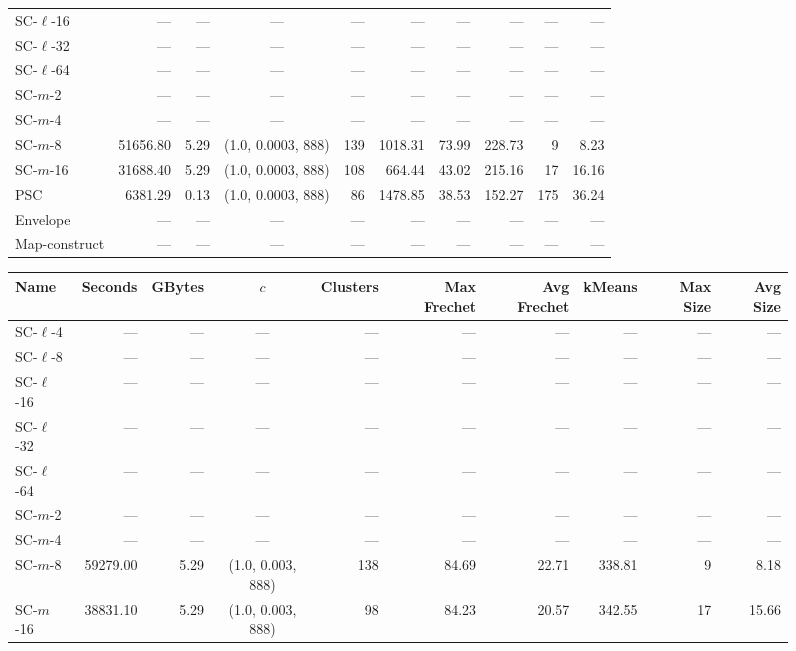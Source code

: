 \begin{figure}
\begin{center}
\begin{minipage}{\textwidth}
{\begin{tabular}{@{}lrrcrrrrrr@{}}
        SC-$\ell$-16 & --- & --- & --- & --- & --- & --- & --- & --- & ---\\
        SC-$\ell$-32 & --- & --- & --- & --- & --- & --- & --- & --- & ---\\
        SC-$\ell$-64 & --- & --- & --- & --- & --- & --- & --- & --- & ---\\
        SC-$m$-2 & --- & --- & --- & --- & --- & --- & --- & --- & ---\\
        SC-$m$-4 & --- & --- & --- & --- & --- & --- & --- & --- & ---\\
        SC-$m$-8 & 51656.80 & 5.29 & (1.0, 0.0003, 888) & 139 & 1018.31 & 73.99 & 228.73 & 9 & 8.23\\
        SC-$m$-16 & 31688.40 & 5.29 & (1.0, 0.0003, 888) & 108 & 664.44 & 43.02 & 215.16 & 17 & 16.16\\
        PSC & 6381.29 & 0.13 & (1.0, 0.0003, 888) & 86 & 1478.85 & 38.53 & 152.27 & 175 & 36.24\\
        Envelope & --- & --- & --- & --- & --- & --- & --- & --- & ---\\
        Map-construct & --- & --- & --- & --- & --- & --- & --- & --- & ---\\
        \bottomrule
    \end{tabular}
    }
    {
    \begin{tabular}{@{}lrrcrrrrrr@{}}
        \toprule
        Name & Seconds & GBytes & $c$ & Clusters & Max Frechet & Avg Frechet & kMeans & Max Size & Avg Size\\
        \midrule
        SC-$\ell$-4 & --- & --- & --- & --- & --- & --- & --- & --- & ---\\
        SC-$\ell$-8 & --- & --- & --- & --- & --- & --- & --- & --- & ---\\
        SC-$\ell$-16 & --- & --- & --- & --- & --- & --- & --- & --- & ---\\
        SC-$\ell$-32 & --- & --- & --- & --- & --- & --- & --- & --- & ---\\
        SC-$\ell$-64 & --- & --- & --- & --- & --- & --- & --- & --- & ---\\
        SC-$m$-2 & --- & --- & --- & --- & --- & --- & --- & --- & ---\\
        SC-$m$-4 & --- & --- & --- & --- & --- & --- & --- & --- & ---\\
        SC-$m$-8 & 59279.00 & 5.29 & (1.0, 0.003, 888) & 138 & 84.69 & 22.71 & 338.81 & 9 & 8.18\\
        SC-$m$-16 & 38831.10 & 5.29 & (1.0, 0.003, 888) & 98 & 84.23 & 20.57 & 342.55 & 17 & 15.66\\

\end{tabular}}
\end{minipage}
\end{center}
\end{figure}

